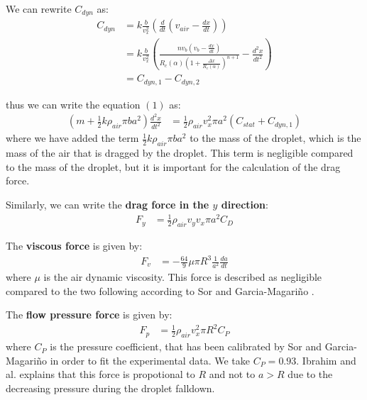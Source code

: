 \documentclass[10pt]{report}
\begin{document}
\par We can rewrite $C_{dyn}$ as:
\begin{align}
    C_{dyn} &= k \frac{b}{v_{x}^2}\left(\frac{d}{dt}\left(v_{air} - \frac{dx}{dt}\right)\right) \\
            &= k \frac{b}{v_{x}^2}\left(\frac{nv_{b}\left(v_{b}-\frac{dx}{dt}\right)}{R_c(\alpha)\left(1+\frac{\Delta x}{R_c(\alpha)}\right)^{n+1}}-\frac{d^2x}{dt^2}\right) \\
            &= C_{dyn,1} - C_{dyn,2} 
\end{align}

thus we can write the equation $(1)$ as:
\begin{align}
    \left(m + \frac{1}{2}k\rho_{air}\pi b a^2\right)\frac{d^2x}{dt^2} &= \frac{1}{2} \rho_{air} v_{x}^2 \pi a^2 \left(C_{stat} + C_{dyn,1}\right)
\end{align}
where we have added the term $\frac{1}{2}k\rho_{air}\pi b a^2$ to the mass of the droplet, which is the mass of the air that is dragged by the droplet. This term is negligible compared to the mass of the droplet, but it is important for the calculation of the drag force.

\par Similarly, we can write the \textbf{drag force in the $y$ direction}:
\begin{align}
    F_y &= \frac{1}{2} \rho_{air} v_{y} v_{x} \pi a^2 C_D
\end{align}

\par The \textbf{viscous force} is given by:
\begin{align}
    F_v &= -\frac{64}{9} \mu \pi R^3 \frac{1}{a^2} \frac{da}{dt}
\end{align}
where $\mu$ is the air dynamic viscosity. This force is described as negligible compared to the two following according to Sor and Garcia-Magariño \cite{Sor2016}.

\par The \textbf{flow pressure force} is given by:
\begin{align}
    F_p &= \frac{1}{2} \rho_{air} v_{x}^2 \pi R^2 C_P
\end{align}
where $C_P$ is the pressure coefficient, that has been calibrated by Sor and Garcia-Magariño \cite{Sor2016} in order to fit the experimental data. We take $C_P =0.93$. Ibrahim and al. \cite{Ibrahim2014} explains that this force is propotional to $R$ and not to $a > R$ due to the decreasing pressure during the droplet falldown.
\end{document}
